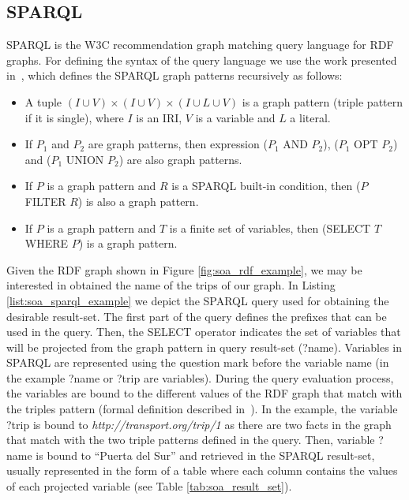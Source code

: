 \subsection{SPARQL}
SPARQL is the W3C recommendation graph matching query language for RDF graphs. For defining the syntax of the query language we use the work presented in~\citep{perez2009semantics}, which defines the SPARQL graph patterns recursively as follows:
\begin{itemize}
    \item A tuple $(I \cup V) \times (I \cup V) \times (I \cup L \cup V)$ is a graph pattern (triple pattern if it is single), where $I$ is an IRI, $V$ is a variable and $L$ a literal.
    \item If $P_1$ and $P_2$ are graph patterns, then expression ($P_1$ AND $P_2$), ($P_1$ OPT $P_2$) and ($P_1$ UNION $P_2$) are also graph patterns.
    \item If $P$ is a graph pattern and $R$ is a SPARQL built-in condition, then ($P$ FILTER $R$) is also a graph pattern.
    \item If $P$ is a graph pattern and $T$ is a finite set of variables, then (SELECT $T$ WHERE $P$) is a graph pattern.
\end{itemize}

Given the RDF graph shown in Figure \ref{fig:soa_rdf_example}, we may be interested in obtained the name of the trips of our graph. In Listing \ref{list:soa_sparql_example} we depict the SPARQL query used for obtaining the desirable result-set. The first part of the query defines the prefixes that can be used in the query. Then, the SELECT operator indicates the set of variables that will be projected from the graph pattern in query result-set (?name). Variables in SPARQL are represented using the question mark before the variable name (in the example ?name or ?trip are variables). During the query evaluation process, the variables are bound to the different values of the RDF graph that match with the triples pattern (formal definition described in~\citep{perez2009semantics}). In the example, the variable ?trip is bound to \textit{http://transport.org/trip/1 } as there are two facts in the graph that match with the two triple patterns defined in the query. Then, variable ?name is bound to ``Puerta del Sur'' and retrieved in the SPARQL result-set, usually represented in the form of a table where each column contains the values of each projected variable (see Table \ref{tab:soa_result_set}).




